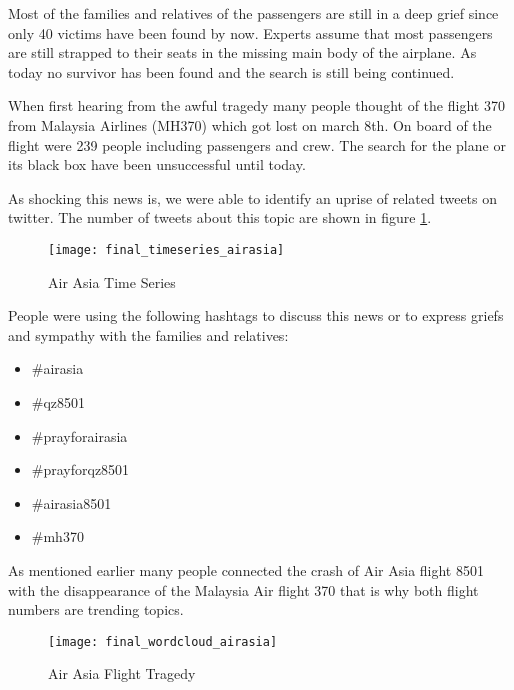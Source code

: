 Most of the families and relatives of the passengers are still in a deep grief since only 40 victims have been found by now. Experts assume that most passengers are still strapped to their seats in the missing main body of the airplane. As today no survivor has been found and the search is still being continued.\cite{bbc2014air}

When first hearing from the awful tragedy many people thought of the flight 370 from Malaysia Airlines (MH370) which got lost on march 8th. On board of the flight were 239 people including passengers and crew. The search for the plane or its black box have been unsuccessful until today.\cite{nbc2014by}

As shocking this news is, we were able to identify an uprise of related tweets on twitter. The number of tweets about this topic are shown in figure \ref{fig:air-asia-time-series}.

\begin{figure}[H]
  \centering
        \texttt{[image: final\_timeseries\_airasia]}
  \caption[Air Asia Time Series]{Air Asia Time Series}
  \label{fig:air-asia-time-series}
  \vspace{-1.3em}
\end{figure}

People were using the following hashtags to discuss this news or to express griefs and sympathy with the families and relatives:

\begin{multicols}{2}
\begin{itemize}[label={}]
	\item \#airasia
	\item \#qz8501
    \item \#prayforairasia
    \item \#prayforqz8501
    \item \#airasia8501
    \item \#mh370
\end{itemize}
\end{multicols}

As mentioned earlier many people connected the crash of Air Asia flight 8501 with the disappearance of the Malaysia Air flight 370 that is why both flight numbers are trending topics.

\begin{figure}[H]
  \centering
        \texttt{[image: final\_wordcloud\_airasia]}
  \caption[Air Asia Flight Tragedy Word Cloud]{Air Asia Flight Tragedy}
  \label{fig:air-asia-flight-tragedy-word-cloud}
  \vspace{-1.3em}
\end{figure}

